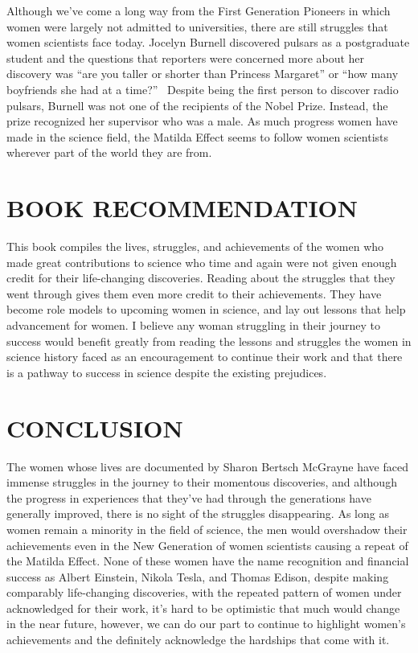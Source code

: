 Although we’ve come a long way from the First Generation Pioneers in which women were largely not admitted to universities, there are still struggles that women scientists face today. Jocelyn Burnell discovered pulsars as a postgraduate student and the questions that reporters were concerned more about her discovery was ``are you taller or shorter than Princess Margaret'' or ``how many boyfriends she had at a time?''~\cite{nobelprize} Despite being the first person to discover radio pulsars, Burnell was not one of the recipients of the Nobel Prize. Instead, the prize recognized her supervisor who was a male. As much progress women have made in the science field, the Matilda Effect seems to follow women scientists wherever part of the world they are from.

\par
\section*{BOOK RECOMMENDATION}

This book compiles the lives, struggles, and achievements of the women who made great contributions to science who time and again were not given enough credit for their life-changing discoveries. Reading about the struggles that they went through gives them even more credit to their achievements. They have become role models to upcoming women in science, and lay out lessons that help advancement for women. I believe any woman struggling in their journey to success would benefit greatly from reading the lessons and struggles the women in science history faced as an encouragement to continue their work and that there is a pathway to success in science despite the existing prejudices.

\par
\section*{CONCLUSION}

The women whose lives are documented by Sharon Bertsch McGrayne have faced immense struggles in the journey to their momentous discoveries, and although the progress in experiences that they’ve had through the generations have generally improved, there is no sight of the struggles disappearing. As long as women remain a minority in the field of science, the men would overshadow their achievements even in the New Generation of women scientists causing a repeat of the Matilda Effect. None of these women have the name recognition and financial success as Albert Einstein, Nikola Tesla, and Thomas Edison, despite making comparably life-changing discoveries, with the repeated pattern of women under acknowledged for their work, it’s hard to be optimistic that much would change in the near future, however, we can do our part to continue to highlight women’s achievements and the definitely acknowledge the hardships that come with it.

\clearpage